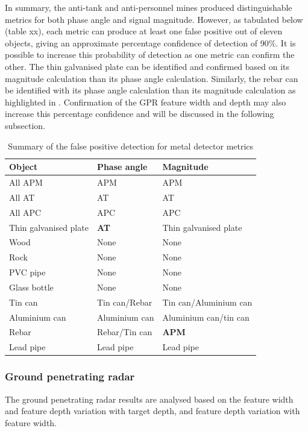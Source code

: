 \documentclass[main.tex]{subfiles}
\begin{document}
In summary, the anti-tank and anti-personnel mines produced distinguishable metrics for both phase angle and signal magnitude. However, as tabulated below (table xx), each metric can produce at least one false positive out of eleven objects, giving an approximate percentage confidence of detection of 90\%. It is possible to increase this probability of detection as one metric can confirm the other. The  thin galvanised plate can be identified and confirmed based on its magnitude calculation than its phase angle calculation. Similarly, the rebar can be identified with its phase angle calculation than its magnitude calculation as highlighted in . Confirmation of the GPR feature width and depth may also increase this percentage confidence and will be discussed in the following subsection.

\begin{table}[ht]
\centering
\caption{ Summary of the false positive detection for metal detector metrics}
\begin{tabular}{lll}
\toprule
Object & Phase angle & Magnitude \\ \midrule
All APM & APM & APM \\
All AT & AT & AT \\
All APC & APC & APC \\
Thin galvanised plate & \textbf{AT} & Thin galvanised plate \\
Wood & None & None \\
Rock & None & None \\
PVC pipe & None & None \\
Glass bottle & None & None \\
Tin can & Tin can/Rebar & Tin can/Aluminium can \\
Aluminium can & Aluminium can & Aluminium can/tin can \\
Rebar & Rebar/Tin can & \textbf{APM} \\
Lead pipe & Lead pipe & Lead pipe\\ \bottomrule
\end{tabular}
\end{table}

\subsubsection{Ground penetrating radar}
The ground penetrating radar results are analysed based on the feature width and feature depth variation with target depth, and feature depth variation with feature width. 
\end{document}
